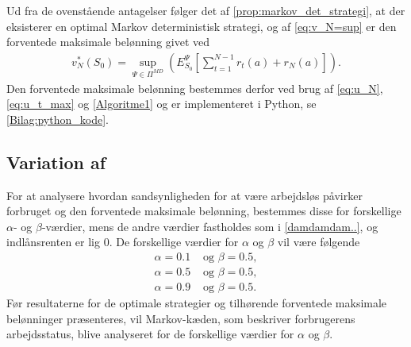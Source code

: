 Ud fra de ovenstående antagelser følger det af \autoref{prop:markov_det_strategi}, at der eksisterer en optimal Markov deterministisk strategi, og af \eqref{eq:v_N=sup} er den forventede maksimale belønning givet ved
\begin{align*}
    v_N^{*} (S_0) = \sup_{\Psi\in \Pi^{MD}}\left( E^{\Psi}_{S_0}\left[\sum_{t=1}^{N-1} r_t(a) + r_N(a)\right] \right).
\end{align*}
Den forventede maksimale belønning bestemmes derfor ved brug af \eqref{eq:u_N}, \eqref{eq:u_t_max} og \autoref{Algoritme1} og er implementeret i Python, se \autoref{Bilag:python_kode}.


\subsection[Variation af  \texorpdfstring{$\alpha$}{alpha}]{Variation af \bm{$\alpha$}}
 
For at analysere hvordan sandsynligheden for at være arbejdsløs påvirker forbruget og den forventede maksimale belønning, bestemmes disse for forskellige $\alpha$- og $\beta$-værdier, mens de andre værdier fastholdes som i \eqref{damdamdam..}, og indlånsrenten er lig $0$. De forskellige værdier for $\alpha$ og $\beta$ vil være følgende
\begin{align*}
    \alpha = 0.1 &\text{ og } \beta = 0.5,\\
    \alpha = 0.5 &\text{ og } \beta = 0.5,\\
    \alpha = 0.9 &\text{ og } \beta = 0.5.
\end{align*}
Før resultaterne for de optimale strategier og tilhørende forventede maksimale belønninger præsenteres, vil Markov-kæden, som beskriver forbrugerens arbejdsstatus, blive analyseret for de forskellige værdier for $\alpha$ og $\beta$.

